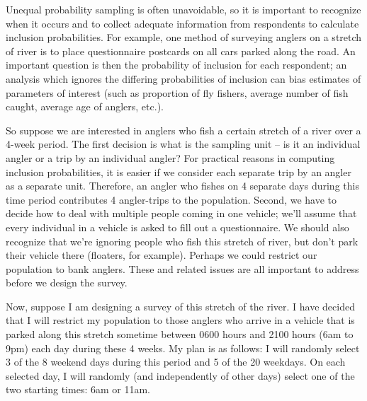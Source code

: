 \documentclass{homework}
\begin{document}
\begin{longproblem}
  Unequal probability sampling is often unavoidable, so it is important to recognize when it occurs and to collect adequate information from respondents to calculate inclusion probabilities.  For example, one method of surveying anglers on a stretch of river is to place questionnaire postcards on all cars parked along the road.  An important question is then the probability of inclusion for each respondent; an analysis which ignores the differing probabilities of inclusion can bias estimates of parameters of interest (such as proportion of fly fishers, average number of fish caught, average age of anglers, etc.).  

  So suppose we are interested in anglers who fish a certain stretch of a river over a 4-week period.  The first decision is what is the sampling unit -- is it an individual angler or a trip by an individual angler?  For practical reasons in computing inclusion probabilities, it is easier if we consider each separate trip by an angler as a separate unit.  Therefore, an angler who fishes on 4 separate days during this time period contributes 4 angler-trips to the population.  Second, we have to decide how to deal with multiple people coming in one vehicle; we'll assume that every individual in a vehicle is asked to fill out a questionnaire.  We should also recognize that we're ignoring people who fish this stretch of river, but don't park their vehicle there (floaters, for example).  Perhaps we could restrict our population to bank anglers.  These and related issues are all important to address before we design the survey.

  Now, suppose I am designing a survey of this stretch of the river.  I have decided that I will restrict my population to those anglers who arrive in a vehicle that is parked along this stretch sometime between 0600 hours and 2100 hours (6am to 9pm) each day during these 4 weeks.  My plan is as follows: I will randomly select 3 of the 8 weekend days during this period and 5 of the 20 weekdays.  On each selected day, I will randomly (and independently of other days) select one of the two starting times: 6am or 11am.  


\end{longproblem}
\end{document}

